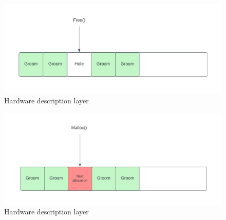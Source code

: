 \begin{figure}[ht!]
    \centering
      \includegraphics[scale=0.5]{images/grooming_free.png}
      \caption{Hardware description layer}
\end{figure}

\begin{figure}[ht!]
    \centering
      \includegraphics[scale=0.5]{images/grooming_prediction.png}
      \caption{Hardware description layer}
\end{figure}